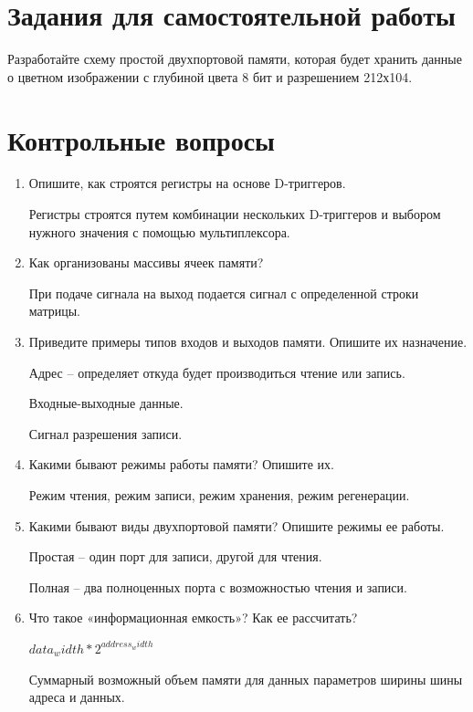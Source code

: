 \documentclass[a4paper,14pt]{article}
\begin{document}
	
	\section{Задания для самостоятельной работы}
	
	Разработайте схему простой двухпортовой памяти, которая будет хранить данные о
	цветном изображении с глубиной цвета 8 бит и разрешением 212х104.
			
	\section{Контрольные вопросы}
	
	\begin{enumerate}
		\item Опишите, как строятся регистры на основе D-триггеров.
		
		Регистры строятся путем комбинации нескольких D-триггеров и выбором нужного значения с помощью мультиплексора.
		
		\item Как организованы массивы ячеек памяти?
		
		При подаче сигнала на выход подается сигнал с определенной строки матрицы.
		
		\item Приведите примеры типов входов и выходов памяти. Опишите их назначение.
		
		Адрес -- определяет откуда будет производиться чтение или запись.
		
		Входные-выходные данные.
		
		Сигнал разрешения записи.
		
		\item Какими бывают режимы работы памяти? Опишите их.
		
		Режим чтения, режим записи, режим хранения, режим регенерации.
		
		\item Какими бывают виды двухпортовой памяти? Опишите режимы ее работы.
		
		Простая -- один порт для записи, другой для чтения.
		
		Полная -- два полноценных порта с возможностью чтения и записи.
		
		\item Что такое «информационная емкость»? Как ее рассчитать?
		
		$ data_width * 2 ^ {address_width} $
		
		Суммарный возможный объем памяти для данных параметров ширины шины адреса и данных.
		

\end{enumerate}
\end{document}
